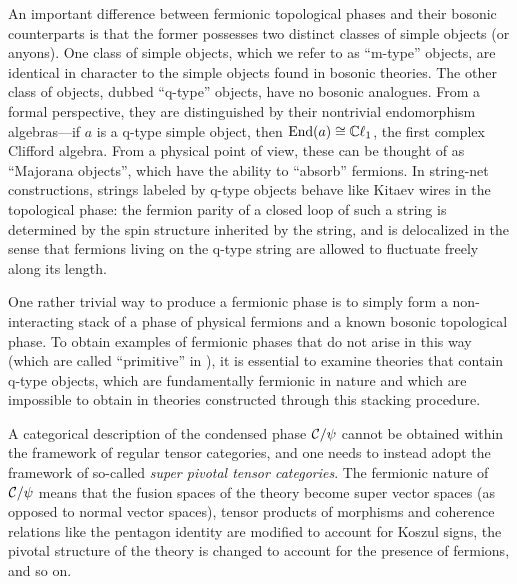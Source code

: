 An important difference between fermionic topological phases and their bosonic counterparts is that 
the former possesses two distinct classes of simple objects (or anyons). 
One class of simple objects, which we refer to as ``m-type'' objects, are identical in character
to the simple objects found in bosonic theories. 
The other class of objects, dubbed ``q-type'' objects, have no bosonic analogues. 
From a formal perspective, they are distinguished by their nontrivial endomorphism algebras---if 
$a$ is a q-type simple object, then $\text{End}(a) \cong \mathbb{C}\ell_1$, the first complex Clifford algebra. 
From a physical point of view, these can be thought of as ``Majorana objects'', which have the ability 
to ``absorb'' fermions. 
In string-net constructions, strings labeled by q-type objects behave like Kitaev wires in the 
topological phase: the fermion parity of a closed loop of such a string is determined by 
the spin structure inherited by the string, and is delocalized in the sense that fermions living on the q-type string are allowed to fluctuate freely along its length.

One rather trivial way to produce a fermionic phase is to simply form a non-interacting stack of a phase of physical fermions 
and a known bosonic topological phase. 
To obtain examples of fermionic phases that do not arise in this way (which are called ``primitive'' in \cite{Lan2016b}),
it is essential to examine theories that contain q-type objects, which are fundamentally fermionic in nature and which are impossible to obtain in theories constructed through this stacking procedure. 

A categorical description of the condensed phase $\mathcal{C} / \psi$ cannot be obtained within the framework 
of regular tensor categories, and one needs to instead adopt the framework of so-called {\it super pivotal tensor categories}. 
The fermionic nature of $\mathcal{C} / \psi$ means that the fusion spaces of the theory become super vector spaces 
(as opposed to normal vector spaces), 
tensor products of morphisms and coherence relations like the pentagon identity are modified to account for Koszul signs, 
the pivotal structure of the theory is changed to account for the presence of fermions, and so on.

